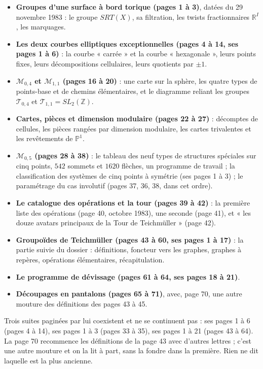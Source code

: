 \documentclass[11pt,a4paper]{article}
\begin{document}
\begin{itemize}
\item \textbf{Groupes d'une surface à bord torique (pages 1 à 3)}, datées du
29 novembre 1983 : le groupe $SRT(X)$, sa filtration, les twists fractionnaires
$\mathbb{R}^{I}$, les marquages.
\item \textbf{Les deux courbes elliptiques exceptionnelles (pages 4 à 14, ses
pages 1 à 6)} : la courbe « carrée » et la courbe « hexagonale », leurs points
fixes, leurs décompositions cellulaires, leurs quotients par $\pm 1$.
\item \textbf{$\mathcal{M}_{0,4}$ et $\mathcal{M}_{1,1}$ (pages 16 à 20)} : une
carte sur la sphère, les quatre types de points-base et de chemins
élémentaires, et le diagramme reliant les groupes $\mathcal{T}_{0,4}$ et
$\mathcal{T}_{1,1} = SL_2(\mathbb{Z})$.
\item \textbf{Cartes, pièces et dimension modulaire (pages 22 à 27)} :
décomptes de cellules, les pièces rangées par dimension modulaire, les cartes
trivalentes et les revêtements de $\mathbb{P}^{1}$.
\item \textbf{$\mathcal{M}_{0,5}$ (pages 28 à 38)} : le tableau des neuf types
de structures spéciales sur cinq points, $542$ sommets et $1620$ flèches, un
programme de travail ; la classification des systèmes de cinq points à
symétrie (ses pages 1 à 3) ; le paramétrage du cas involutif (pages 37, 36, 38,
dans cet ordre).
\item \textbf{Le catalogue des opérations et la tour (pages 39 à 42)} : la
première liste des opérations (page 40, octobre 1983), une seconde (page 41),
et « les douze avatars principaux de la Tour de Teichmüller » (page 42).
\item \textbf{Groupoïdes de Teichmüller (pages 43 à 60, ses pages 1 à 17)} :
la partie suivie du dossier : définitions, foncteur vers les graphes,
graphes à repères, opérations élémentaires, récapitulation.
\item \textbf{Le programme de dévissage (pages 61 à 64, ses pages 18 à 21)}.
\item \textbf{Découpages en pantalons (pages 65 à 71)}, avec, page 70, une
autre mouture des définitions des pages 43 à 45.
\end{itemize}

Trois suites paginées par lui coexistent et ne se continuent pas : ses pages 1
à 6 (pages 4 à 14), ses pages 1 à 3 (pages 33 à 35), ses pages 1 à 21 (pages 43
à 64). La page 70 recommence les définitions de la page 43 avec d'autres
lettres ; c'est une autre mouture et on la lit à part, sans la fondre dans la
première. Rien ne dit laquelle est la plus ancienne.
\end{document}
